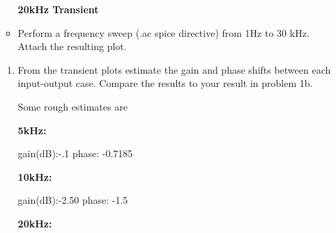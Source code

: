 \documentclass{article}
\begin{document}
\begin{enumerate}
\begin{itemize}
        \begin{center}
            \textbf{20kHz Transient}
        \end{center}
        \item Perform a frequency sweep (.ac spice directive) from 1Hz to 30 kHz. Attach the resulting plot.
    \end{itemize}
    \begin{enumerate}
        \item From the transient plots estimate the gain and phase shifts between each input-output case. Compare the results to your result in problem 1b.
        \begin{center}
            Some rough estimates are
            
            \textbf{5kHz:}
            
            gain(dB):-.1 phase: -0.7185
            
            \textbf{10kHz:} 
            
            gain(dB):-2.50 phase: -1.5
            
            \textbf{20kHz:} 
            

\end{center}
\end{enumerate}
\end{enumerate}
\end{document}
